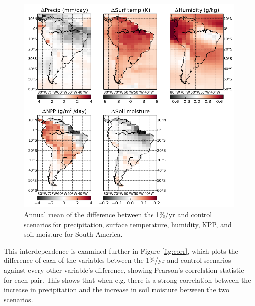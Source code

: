 \documentclass{article}
\begin{document}
\begin{figure}[hbp]
    \centering
    \includegraphics[width=\textwidth]{figures/sa_diff}
    \caption{Annual mean of the difference between the 1\%/yr and control scenarios for precipitation, surface temperature, humidity, NPP, and soil moisture for South America.}
    \label{fig:sa_diff}
\end{figure}

\newpage

This interdependence is examined further in Figure \ref{fig:corr}, which plots the difference of each of the variables between the 1\%/yr and control scenarios against every other variable's difference, showing Pearson's correlation statistic for each pair. This shows that when e.g. there is a strong correlation between the increase in precipitation and the increase in soil moisture between the two scenarios. 
\end{document}
